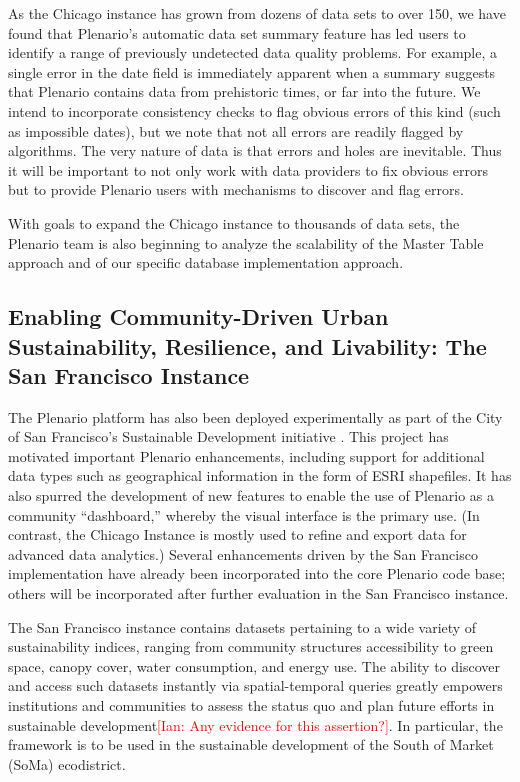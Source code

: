 \documentclass[11pt]{article}
\newcommand{\ian}[1]{\textcolor{Red}{[Ian: #1]}}
\newcommand{\ian}[1]{}
\begin{document}
As the Chicago instance has grown from dozens of data sets to over 150, we have found that Plenario's automatic data set summary feature has led users to identify a range of previously undetected data quality problems. For example, a single error in the date field is immediately apparent when a summary suggests that Plenario contains data from prehistoric times, or far into the future. We intend to incorporate consistency checks to flag obvious errors of this kind (such as impossible dates), but we note that not all errors are  readily flagged by algorithms. The very nature of data is that errors and holes are inevitable. Thus it will be important to not only work with data providers to fix obvious errors but to provide Plenario users with mechanisms to discover and flag errors. 

With goals to expand the Chicago instance to thousands of data sets, the Plenario team is also beginning to analyze the scalability of the Master Table approach and of our specific database implementation approach.

\subsection{\textbf{Enabling Community-Driven Urban Sustainability, Resilience, and Livability: The San Francisco Instance}}\label{san-francisco-instance}
The Plenario platform has also  been deployed experimentally as part of the City of San Francisco's Sustainable Development initiative \cite{sf-sustainable-systems}. This project has motivated important Plenario enhancements, including support for additional data types such as geographical information in the form of ESRI shapefiles. It has also spurred the development of new features to enable the use of Plenario as a community ``dashboard,'' whereby the visual interface is the primary use. (In contrast, the Chicago Instance is mostly used to refine and export data for advanced data analytics.) Several enhancements driven by the San Francisco implementation have already been incorporated into the core Plenario code base; others will be incorporated after further evaluation in the San Francisco instance.

The San Francisco instance contains datasets pertaining to a wide variety of sustainability indices, ranging from community structures accessibility to green space, canopy cover, water consumption, and energy use. The ability to discover and access such datasets instantly via spatial-temporal queries greatly empowers institutions and communities to assess the status quo and plan future efforts in sustainable development\ian{Any evidence for this assertion?}. In particular, the framework is to be used in the sustainable development of the South of Market (SoMa) ecodistrict.
\end{document}

